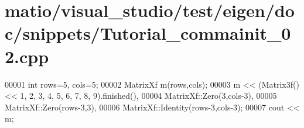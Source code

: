 \hypertarget{matio_2visual__studio_2test_2eigen_2doc_2snippets_2_tutorial__commainit__02_8cpp_source}{}\section{matio/visual\+\_\+studio/test/eigen/doc/snippets/\+Tutorial\+\_\+commainit\+\_\+02.cpp}
\label{matio_2visual__studio_2test_2eigen_2doc_2snippets_2_tutorial__commainit__02_8cpp_source}

\begin{DoxyCode}
00001 \textcolor{keywordtype}{int} rows=5, cols=5;
00002 MatrixXf m(rows,cols);
00003 m << (Matrix3f() << 1, 2, 3, 4, 5, 6, 7, 8, 9).finished(),
00004      MatrixXf::Zero(3,cols-3),
00005      MatrixXf::Zero(rows-3,3),
00006      MatrixXf::Identity(rows-3,cols-3);
00007 cout << m;
\end{DoxyCode}
